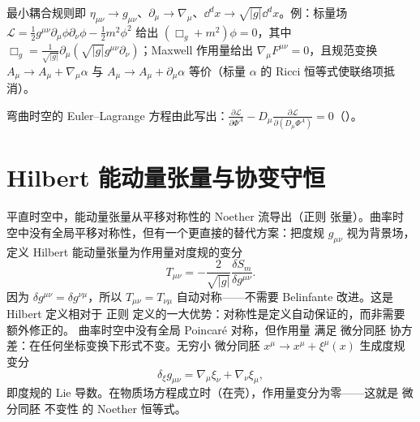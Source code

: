 最小耦合规则即 $\eta_{\mu\nu}\to g_{\mu\nu}$、$\partial_\mu\to\nabla_\mu$、$\dd^dx\to\sqrt{|g|}\dd^dx$。例：标量场 $\mathcal{L}=\frac12g^{\mu\nu}\partial_\mu\phi\partial_\nu\phi-\frac12m^2\phi^2$ 给出 $(\Box_g+m^2)\phi=0$，其中 $\Box_g=\frac1{\sqrt{|g|}}\partial_\mu(\sqrt{|g|}g^{\mu\nu}\partial_\nu)$；Maxwell 作用量给出 $\nabla_\mu F^{\mu\nu}=0$，且规范变换 $A_\mu\to A_\mu+\nabla_\mu\alpha$ 与 $A_\mu\to A_\mu+\partial_\mu\alpha$ 等价（标量 $\alpha$ 的 Ricci 恒等式使联络项抵消）。

弯曲时空的 Euler--Lagrange 方程由此写出：$\frac{\partial\mathcal L}{\partial\Phi^A}-D_\mu\frac{\partial\mathcal L}{\partial(D_\mu\Phi^A)}=0$（）。

\section{Hilbert 能动量张量与协变守恒}
平直时空中，能动量张量从平移对称性的 Noether 流导出（正则 张量）。曲率时空中没有全局平移对称性，但有一个更直接的替代方案：把度规 $g_{\mu\nu}$ 视为背景场，定义 Hilbert 能动量张量为作用量对度规的变分
\begin{equation}\label{eq:ms-curved-T-hilbert}
\boxed{
T_{\mu\nu}=-\frac{2}{\sqrt{|g|}}\frac{\delta S_m}{\delta g^{\mu\nu}}.
}
\end{equation}
因为 $\delta g^{\mu\nu}=\delta g^{\nu\mu}$，所以 $T_{\mu\nu}=T_{\nu\mu}$ 自动对称——不需要 Belinfante 改进。这是 Hilbert 定义相对于 正则 定义的一大优势：对称性是定义自动保证的，而非需要额外修正的。
曲率时空中没有全局 Poincaré 对称，但作用量 满足 微分同胚 协方差：在任何坐标变换下形式不变。无穷小 微分同胚 $x^\mu\to x^\mu+\xi^\mu(x)$ 生成度规变分
\begin{equation*}
\delta_\xi g_{\mu\nu}=\nabla_\mu\xi_\nu+\nabla_\nu\xi_\mu,
\end{equation*}
即度规的 Lie 导数。在物质场方程成立时（在壳），作用量变分为零——这就是 微分同胚 不变性 的 Noether 恒等式。

